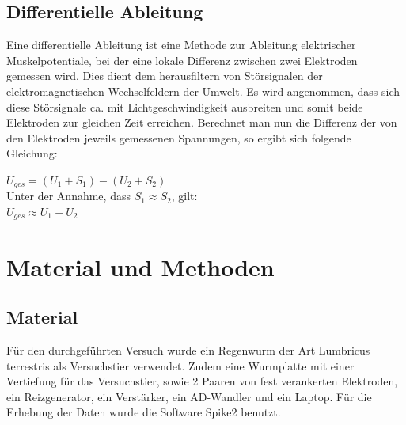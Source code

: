 \documentclass[11pt]{article}
\begin{document}
\subsection{Differentielle Ableitung}
Eine differentielle Ableitung ist eine Methode zur Ableitung elektrischer Muskelpotentiale, bei der eine lokale Differenz zwischen zwei Elektroden gemessen wird. Dies dient dem herausfiltern von Störsignalen der elektromagnetischen Wechselfeldern der Umwelt. Es wird angenommen, dass sich diese Störsignale ca. mit Lichtgeschwindigkeit ausbreiten und somit beide Elektroden zur gleichen Zeit erreichen. Berechnet man nun die Differenz der von den Elektroden jeweils gemessenen Spannungen, so ergibt sich folgende Gleichung:
\begin{center}
$U_{ges}= (U_1+S_1) - (U_2 + S_2)$ \\

Unter der Annahme, dass $S_1 \approx S_2$, gilt: \\

$U_{ges} \approx U_1 - U_2$
\end{center}




\section{Material und Methoden}
\subsection{Material}
Für den durchgeführten Versuch wurde ein Regenwurm der Art Lumbricus terrestris als Versuchstier verwendet. Zudem eine Wurmplatte mit einer Vertiefung für das Versuchstier, sowie 2 Paaren von fest verankerten Elektroden, ein Reizgenerator, ein Verstärker, ein AD-Wandler und ein Laptop. Für die Erhebung der Daten wurde die Software Spike2 benutzt.
\end{document}
